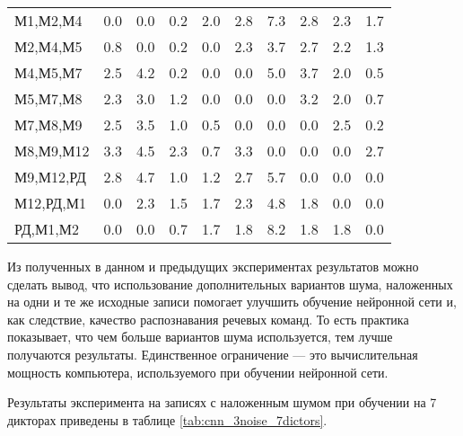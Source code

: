\begin{table}[h]
\begin{tabular}{| l | c | c | c | c | c | c | c | c | c |}
		\hline
		М1,М2,М4  & 0.0 & 0.0 & 0.2 & 2.0 & 2.8 & 7.3 & 2.8 & 2.3 & 1.7 \\
		М2,М4,М5  & 0.8 & 0.0 & 0.2 & 0.0 & 2.3 & 3.7 & 2.7 & 2.2 & 1.3 \\
		М4,М5,М7  & 2.5 & 4.2 & 0.2 & 0.0 & 0.0 & 5.0 & 3.7 & 2.0 & 0.5 \\
		М5,М7,М8  & 2.3 & 3.0 & 1.2 & 0.0 & 0.0 & 0.0 & 3.2 & 2.0 & 0.7 \\
		М7,М8,М9  & 2.5 & 3.5 & 1.0 & 0.5 & 0.0 & 0.0 & 0.0 & 2.5 & 0.2 \\
		М8,М9,М12 & 3.3 & 4.5 & 2.3 & 0.7 & 3.3 & 0.0 & 0.0 & 0.0 & 2.7 \\
		М9,М12,РД & 2.8 & 4.7 & 1.0 & 1.2 & 2.7 & 5.7 & 0.0 & 0.0 & 0.0 \\
		М12,РД,М1 & 0.0 & 2.3 & 1.5 & 1.7 & 2.3 & 4.8 & 1.8 & 0.0 & 0.0 \\
		РД,М1,М2  & 0.0 & 0.0 & 0.7 & 1.7 & 1.8 & 8.2 & 1.8 & 1.8 & 0.0 \\
		\hline
	\end{tabular}
\end{table}

Из полученных в данном и предыдущих экспериментах результатов можно сделать вывод, что использование дополнительных вариантов шума, наложенных на одни и те же исходные записи помогает улучшить обучение нейронной сети и, как следствие, качество распознавания речевых команд.
То есть практика показывает, что чем больше вариантов шума используется, тем лучше получаются результаты.
Единственное ограничение --- это вычислительная мощность компьютера, используемого при обучении нейронной сети.

Результаты эксперимента на записях с наложенным шумом при обучении на 7 дикторах приведены в таблице \ref{tab:cnn_3noise_7dictors}.

